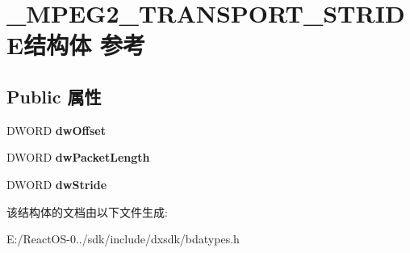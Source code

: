 \hypertarget{struct___m_p_e_g2___t_r_a_n_s_p_o_r_t___s_t_r_i_d_e}{}\section{\+\_\+\+M\+P\+E\+G2\+\_\+\+T\+R\+A\+N\+S\+P\+O\+R\+T\+\_\+\+S\+T\+R\+I\+D\+E结构体 参考}
\label{struct___m_p_e_g2___t_r_a_n_s_p_o_r_t___s_t_r_i_d_e}
\subsection*{Public 属性}
\begin{DoxyCompactItemize}
\item 
\mbox{\label{struct___m_p_e_g2___t_r_a_n_s_p_o_r_t___s_t_r_i_d_e_a6de3dd9459fc370b1f819ba43552b795}} 
D\+W\+O\+RD {\bfseries dw\+Offset}
\item 
\mbox{\label{struct___m_p_e_g2___t_r_a_n_s_p_o_r_t___s_t_r_i_d_e_a6a92a70a1192ce5a40d8eb56713e4593}} 
D\+W\+O\+RD {\bfseries dw\+Packet\+Length}
\item 
\mbox{\label{struct___m_p_e_g2___t_r_a_n_s_p_o_r_t___s_t_r_i_d_e_a222d1198d21626ceaafcdd07ddd4a8a1}} 
D\+W\+O\+RD {\bfseries dw\+Stride}
\end{DoxyCompactItemize}


该结构体的文档由以下文件生成\+:\begin{DoxyCompactItemize}
\item 
E\+:/\+React\+O\+S-\/0../sdk/include/dxsdk/bdatypes.\+h\end{DoxyCompactItemize}
